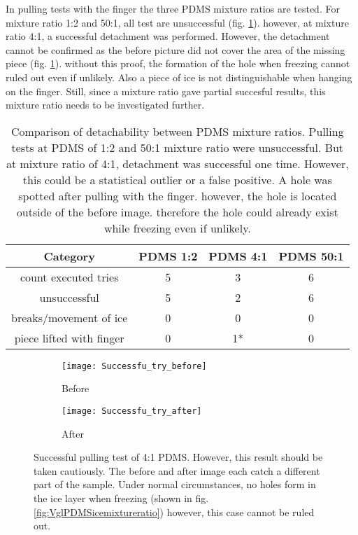 In pulling tests with the finger the three PDMS mixture ratios are tested. For mixture ratio 1:2 and 50:1, all test are unsuccessful (fig. \ref{table:AttemptsPDMS}). however, at mixture ratio 4:1, a successful detachment was performed. However, the detachment cannot be confirmed as the before picture did not cover the area of the missing piece (fig. \ref{fig:SuccessfulDetachment}). without this proof, the formation of the hole when freezing cannot ruled out even if unlikely. Also a piece of ice is not distinguishable when hanging on the finger. Still, since a mixture ratio gave partial succesful results, this mixture ratio needs to be investigated further.

\begin{table}
	\centering
	\begin{tabular}{|c|c|c|c|}
		\hline
		Category & PDMS 1:2 & PDMS 4:1 & PDMS 50:1 \\
		\hline
		\hline
		count executed tries & 5 & 3 & 6\\
		\hline
		unsuccessful & 5 & 2 & 6\\
		\hline
		breaks/movement of ice & 0 & 0 & 0\\
		\hline
		piece lifted with finger & 0 & 1* & 0\\
		\hline		
	\end{tabular}
	\caption{Comparison of detachability between PDMS mixture ratios. Pulling tests at PDMS of 1:2 and 50:1 mixture ratio were unsuccessful. But at mixture ratio of 4:1, detachment was successful one time. However, this could be a statistical outlier or a false positive. A hole was spotted after pulling with the finger. however, the hole is located outside of the before image. therefore the hole could already exist while freezing even if unlikely.}
	\label{table:AttemptsPDMS}
\end{table}

\begin{figure}[hbt!]
	\centering
	\begin{subfigure}[]{0.45\textwidth}
		\centering
		\texttt{[image: Successfu\_try\_before]}
		\caption{Before}
	\end{subfigure}
	\begin{subfigure}[]{0.45\textwidth}
		\centering
		\texttt{[image: Successfu\_try\_after]}
		\caption{After}
	\end{subfigure}
	\caption{Successful pulling test of 4:1 PDMS. However, this result should be taken cautiously. The before and after image each catch a different part of the sample. Under normal circumstances, no holes form in the ice layer when freezing (shown in fig. \ref{fig:VglPDMSicemixtureratio}) however, this case cannot be ruled out.}
	\label{fig:SuccessfulDetachment}
\end{figure}

